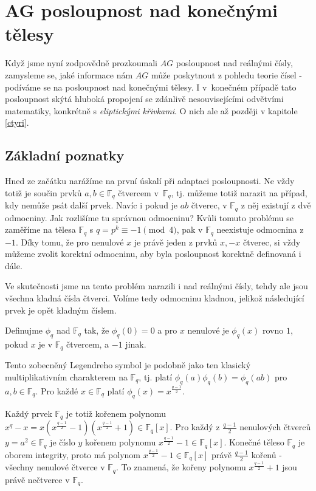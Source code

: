 \documentclass[12pt]{report}
\begin{document}
\chapter{AG posloupnost nad konečnými tělesy}

Když jsme nyní zodpovědně prozkoumali $AG$ posloupnost nad reálnými čísly, zamysleme se, jaké informace nám $AG$ může poskytnout z pohledu teorie čísel - podíváme se na posloupnost nad konečnými tělesy. I v~konečném případě tato posloupnost skýtá hluboká propojení se zdánlivě nesouvisejícími odvětvími matematiky, konkrétně s \textit{eliptickými křivkami}. O nich ale až později v kapitole \ref{ctyri}.


\section{Základní poznatky}

Hned ze začátku narážíme na první úskalí při adaptaci posloupnosti. Ne vždy totiž je součin prvků $a,b \in \mathbb{F}_q$ čtvercem v~$\mathbb{F}_q$, tj. můžeme totiž narazit na případ, kdy nemůže psát další prvek. Navíc i pokud je $ab$ čtverec, v $\mathbb{F}_q$ z něj existují z dvě odmocniny. Jak rozlišíme tu správnou odmocninu? Kvůli tomuto problému se zaměříme na tělesa $\mathbb{F}_q$ s $q = p^k \equiv -1 \pmod{4}$, pak v $\mathbb{F}_q$ neexistuje odmocnina z $-1$. Díky tomu, že pro nenulové $x$ je právě jeden z prvků $x, -x$ čtverec, si vždy můžeme zvolit korektní odmocninu, aby byla posloupnost korektně definovaná i dále.  

\begin{poznamka}
Ve skutečnosti jsme na tento problém narazili i nad reálnými čísly, tehdy ale jsou všechna kladná čísla čtverci. Volíme tedy odmocninu kladnou, jelikož následující prvek je opět kladným číslem.
\end{poznamka}

\begin{definice}
Definujme  $\phi_q$ nad $\mathbb{F}_q$ tak, že $\phi_q(0) = 0$ a pro $x$ nenulové je $\phi_q(x)$ rovno $1$, pokud $x$ je v $\mathbb{F}_q$ čtvercem,  a $-1$ jinak.
\end{definice}

Tento zobecněný Legendreho symbol je podobně jako ten klasický multiplikativním charakterem na $\mathbb{F}_q$, tj. platí $\phi_q(a)\phi_q(b)=\phi_q(ab)$ pro $a,b \in \mathbb{F}_q$. Pro každé $x \in \mathbb{F}_q$ platí $\phi_q(x) = x^{\frac{q-1}{2}}$.

Každý prvek $\mathbb{F}_q$ je totiž kořenem polynomu $x^{q} - x = x \left(x^{\frac{q-1}{2}} - 1\right) \left( x^{\frac{q-1}{2}}+1 \right) \in \mathbb{F}_q [x]$. Pro každý z $\frac{q-1}{2}$ nenulových čtverců $y = a^2 \in \mathbb{F}_q$ je číslo $y$ kořenem polynomu $x^{\frac{q-1}{2}} - 1 \in \mathbb{F}_q [x]$. Konečné těleso $\mathbb{F}_q$ je oborem integrity, proto má polynom $x^{\frac{q-1}{2}} - 1 \in \mathbb{F}_q [x]$ právě $\frac{q-1}{2}$ kořenů - všechny nenulové čtverce v $\mathbb{F}_q$. To znamená, že kořeny polynomu $x^{\frac{q-1}{2}}+1$ jsou právě nečtverce v $\mathbb{F}_q$.
\end{document}
